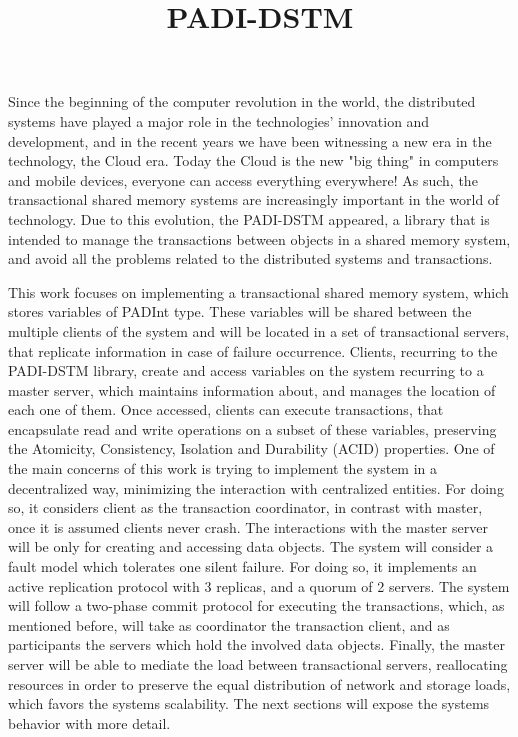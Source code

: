 \documentclass[times, 10pt,twocolumn]{article}
\begin{document}
\title{PADI-DSTM}



\maketitle
\thispagestyle{empty}


Since the beginning of the computer revolution in the world, the distributed systems have played a major role in the technologies' innovation and development, and in the recent years we have been witnessing a new era in the technology, the Cloud era. Today the Cloud is the new "big thing" in computers and mobile devices, everyone can access everything  everywhere! As such, the transactional shared memory systems are increasingly important in the world of technology. Due to this evolution, the PADI-DSTM appeared, a library that is intended to manage the transactions between objects in a shared memory system, and avoid all the problems related to the distributed systems and transactions.

This work focuses on implementing a transactional shared memory system, which stores variables of PADInt type. These variables will be shared between the multiple clients of the system and will be located in a set of transactional servers, that replicate information in case of failure occurrence. Clients, recurring to the PADI-DSTM library, create and access variables on the system recurring to a master server, which maintains information about, and manages the location of each one of them. Once accessed, clients can execute transactions, that encapsulate read and write operations on a subset of these variables, preserving the Atomicity, Consistency, Isolation and Durability (ACID) properties. One of the main concerns of this work is trying to implement the system in a decentralized way, minimizing the interaction with centralized entities. For doing so, it considers client as the transaction coordinator, in contrast with master, once it is assumed clients never crash. The interactions with the master server will be only for creating and accessing data objects. The system will consider a fault model which tolerates one silent failure. For doing so, it implements an active replication protocol with 3 replicas, and a quorum of 2 servers. The system will follow a two-phase commit protocol for executing the transactions, which, as mentioned before, will take as coordinator the transaction client, and as participants the servers which hold the involved data objects. Finally, the master server will be able to mediate the load between transactional servers, reallocating resources in order to preserve the equal distribution of network and storage loads, which favors the systems scalability. The next sections will expose the systems behavior with more detail.  
\end{document}
